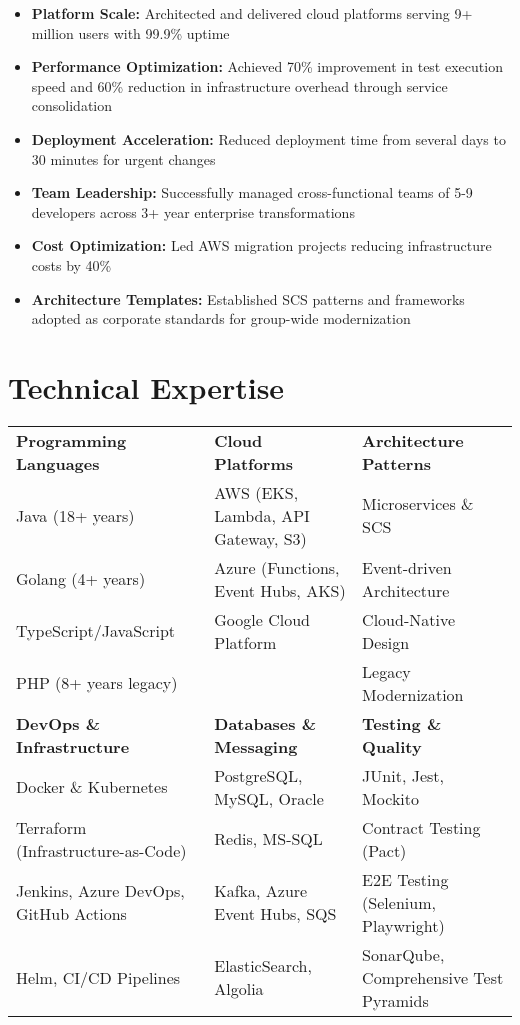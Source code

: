 \documentclass[10pt,a4paper]{article}
\begin{document}
\begin{itemize}
\item \textbf{Platform Scale:} Architected and delivered cloud platforms serving 9+ million users with 99.9\% uptime
\item \textbf{Performance Optimization:} Achieved 70\% improvement in test execution speed and 60\% reduction in infrastructure overhead through service consolidation
\item \textbf{Deployment Acceleration:} Reduced deployment time from several days to 30 minutes for urgent changes
\item \textbf{Team Leadership:} Successfully managed cross-functional teams of 5-9 developers across 3+ year enterprise transformations
\item \textbf{Cost Optimization:} Led AWS migration projects reducing infrastructure costs by 40\%
\item \textbf{Architecture Templates:} Established SCS patterns and frameworks adopted as corporate standards for group-wide modernization
\end{itemize}

\vspace{6pt}

\section{Technical Expertise}

\begin{tabularx}{\textwidth}{@{}X X X@{}}
\textbf{Programming Languages} & \textbf{Cloud Platforms} & \textbf{Architecture Patterns} \\
Java (18+ years) & AWS (EKS, Lambda, API Gateway, S3) & Microservices \& SCS \\
Golang (4+ years) & Azure (Functions, Event Hubs, AKS) & Event-driven Architecture \\
TypeScript/JavaScript & Google Cloud Platform & Cloud-Native Design \\
PHP (8+ years legacy) & & Legacy Modernization \\[6pt]

\textbf{DevOps \& Infrastructure} & \textbf{Databases \& Messaging} & \textbf{Testing \& Quality} \\
Docker \& Kubernetes & PostgreSQL, MySQL, Oracle & JUnit, Jest, Mockito \\
Terraform (Infrastructure-as-Code) & Redis, MS-SQL & Contract Testing (Pact) \\
Jenkins, Azure DevOps, GitHub Actions & Kafka, Azure Event Hubs, SQS & E2E Testing (Selenium, Playwright) \\
Helm, CI/CD Pipelines & ElasticSearch, Algolia & SonarQube, Comprehensive Test Pyramids \\
\end{tabularx}
\end{document}
